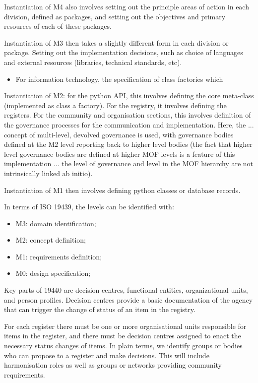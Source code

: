 \documentclass[]{elsarticle}
\begin{document}
Instantiation of M4 also involves setting out the principle areas of action 
in each division, defined as packages, and setting out the objectives and primary resources of each of these packages.

Instantiation of M3 then takes a slightly different form in each division or package. Setting out the implementation
decisions, such as choice of languages and external resources (libraries, technical standards, etc).

\begin{itemize} 
\item For information technology, the specification of class factories which
\end{itemize}

Instantiation of M2: for the python API, this involves defining the core meta-class (implemented as class a factory). For the
registry, it involves defining the registers. For the community and organisation sections, this involves definition of the
governance processes for the communication and implementation. Here, the ... concept of multi-level, devolved governance is
used, with governance bodies defined at the M2 level reporting back to higher level bodies (the fact that higher level
governance bodies are defined at higher MOF levels is a feature of this implementation ... the level of
governance and level in the MOF hierarchy are not intrinsically linked ab initio).

Instantiation of M1 then involves defining python classes or database records.

In terms of ISO 19439, the levels can be identified with:
\begin{itemize} 
\item M3: domain identification;
\item M2: concept definition;
\item M1: requirements definition;
\item M0: design specification;
\end{itemize} 


Key parts of 19440 are decision centres, functional entities, organizational units, and person profiles.  Decision centres provide
a basic documentation of the agency that can trigger the change of status of an item in the registry.

For each register there must be one or more organisational units responsible for items in the register, and there must be decision
centres assigned to enact the necessary status changes of items.
In plain terms, we identify groups or bodies who can propose to a register and make decisions. This will include harmonisation
roles as well as groups or networks providing community requirements.
\end{document}
